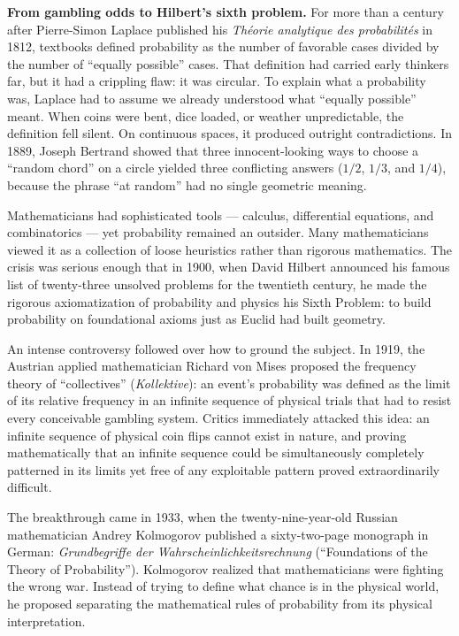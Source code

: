 \begin{historybox}
\textbf{From gambling odds to Hilbert's sixth problem.}
For more than a century after Pierre-Simon Laplace published his \emph{Th\'eorie
analytique des probabilit\'es} in 1812, textbooks defined probability as the
number of favorable cases divided by the number of ``equally possible'' cases.
That definition had carried early thinkers far, but it had a crippling flaw:
it was circular. To explain what a probability was, Laplace had to assume we
already understood what ``equally possible'' meant. When coins were bent, dice
loaded, or weather unpredictable, the definition fell silent. On continuous
spaces, it produced outright contradictions. In 1889, Joseph Bertrand showed
that three innocent-looking ways to choose a ``random chord'' on a circle
yielded three conflicting answers ($1/2$, $1/3$, and $1/4$), because the phrase
``at random'' had no single geometric meaning.

Mathematicians had sophisticated tools --- calculus, differential equations, and
combinatorics --- yet probability remained an outsider. Many mathematicians
viewed it as a collection of loose heuristics rather than rigorous mathematics.
The crisis was serious enough that in 1900, when David Hilbert announced his famous
list of twenty-three unsolved problems for the twentieth century, he made the
rigorous axiomatization of probability and physics his Sixth Problem: to build
probability on foundational axioms just as Euclid had built geometry.

An intense controversy followed over how to ground the subject. In 1919, the
Austrian applied mathematician Richard von Mises proposed the frequency theory
of ``collectives'' (\emph{Kollektive}): an event's probability was defined as
the limit of its relative frequency in an infinite sequence of physical trials
that had to resist every conceivable gambling system. Critics immediately
attacked this idea: an infinite sequence of physical coin flips cannot exist in
nature, and proving mathematically that an infinite sequence could be
simultaneously completely patterned in its limits yet free of any exploitable
pattern proved extraordinarily difficult.

The breakthrough came in 1933, when the twenty-nine-year-old Russian
mathematician Andrey Kolmogorov published a sixty-two-page monograph in German:
\emph{Grundbegriffe der Wahrscheinlichkeitsrechnung} (``Foundations of the
Theory of Probability''). Kolmogorov realized that mathematicians were fighting
the wrong war. Instead of trying to define what chance is in the
physical world, he proposed separating the mathematical rules of probability
from its physical interpretation.


\end{historybox}

